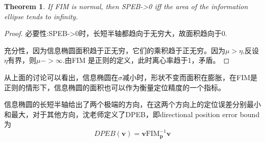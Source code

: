 \documentclass[12pt]{article}
\newtheorem{thm}{Theorem}[section]
\theoremstyle{remark}
\begin{document}
\begin{thm} If FIM is normal, then SPEB->0 iff the area of the information ellipse tends to infinity.\end{thm}
\begin{proof}
必要性:SPEB->0时，长短半轴都趋向于无穷大，故面积趋向于0.

充分性，因为信息椭圆面积趋于正无穷，它们的乘积趋于正无穷。因为$\mu>\eta$,反设$\eta$有界，则$\mu->\infty$.由FIM 是正则的定义，此时离心率趋于1，矛盾。\end{proof}

从上面的讨论可以看出，信息椭圆在$\sigma$减小时，形状不变而面积在膨胀，在FIM是正则的情形下，信息椭圆的面积也可以作为衡量定位精度的一个指标。

信息椭圆的长短半轴给出了两个极端的方向，在这两个方向上的定位误差分别最小和最大，对于其他方向，沈老师定义了DPEB，即directional position error bound为
\begin{equation}
DPEB(\bm{v})=\bm{v}\text{FIM}^{-1}_{\bm{p}}\bm{v}
\end{equation}
\end{document}
